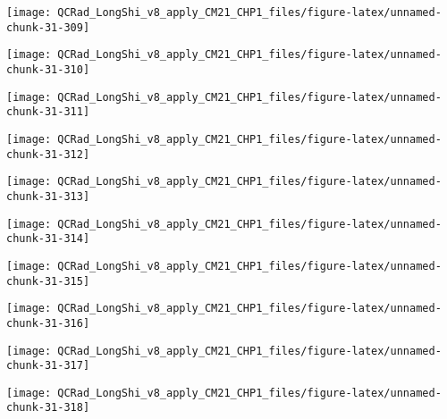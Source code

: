 \documentclass[
  10pt,
  a4paper,oneside]{article}
\begin{document}
\begin{center}\texttt{[image: QCRad\_LongShi\_v8\_apply\_CM21\_CHP1\_files/figure-latex/unnamed-chunk-31-309]} \end{center}

\begin{center}\texttt{[image: QCRad\_LongShi\_v8\_apply\_CM21\_CHP1\_files/figure-latex/unnamed-chunk-31-310]} \end{center}

\begin{center}\texttt{[image: QCRad\_LongShi\_v8\_apply\_CM21\_CHP1\_files/figure-latex/unnamed-chunk-31-311]} \end{center}

\begin{center}\texttt{[image: QCRad\_LongShi\_v8\_apply\_CM21\_CHP1\_files/figure-latex/unnamed-chunk-31-312]} \end{center}

\begin{center}\texttt{[image: QCRad\_LongShi\_v8\_apply\_CM21\_CHP1\_files/figure-latex/unnamed-chunk-31-313]} \end{center}

\begin{center}\texttt{[image: QCRad\_LongShi\_v8\_apply\_CM21\_CHP1\_files/figure-latex/unnamed-chunk-31-314]} \end{center}

\begin{center}\texttt{[image: QCRad\_LongShi\_v8\_apply\_CM21\_CHP1\_files/figure-latex/unnamed-chunk-31-315]} \end{center}

\begin{center}\texttt{[image: QCRad\_LongShi\_v8\_apply\_CM21\_CHP1\_files/figure-latex/unnamed-chunk-31-316]} \end{center}

\begin{center}\texttt{[image: QCRad\_LongShi\_v8\_apply\_CM21\_CHP1\_files/figure-latex/unnamed-chunk-31-317]} \end{center}

\begin{center}\texttt{[image: QCRad\_LongShi\_v8\_apply\_CM21\_CHP1\_files/figure-latex/unnamed-chunk-31-318]} \end{center}
\end{document}
